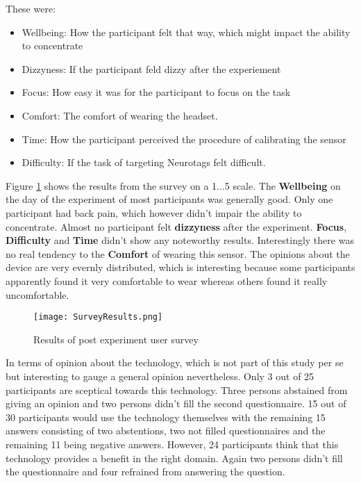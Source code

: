             These were:

            \begin{itemize}
                \item Wellbeing: How the participant felt that way, which might impact the ability to concentrate
                \item Dizzyness: If the participant feld dizzy after the experiement
                \item Focus: How easy it was for the participant to focus on the task
                \item Comfort: The comfort of wearing the headset.
                \item Time: How the participant perceived the procedure of calibrating the sensor 
                \item Difficulty: If the task of targeting Neurotags felt difficult.
            \end{itemize}

            Figure \ref*{survey-boxplots} shows the results from the survey on a 1...5 scale. The \textbf{Wellbeing} on the day of the experiment of most participants was generally good. Only one participant had back pain, which however didn't impair the ability to concentrate. Almost no participant felt \textbf{dizzyness} after the experiment. \textbf{Focus}, \textbf{Difficulty} and \textbf{Time} didn't show any noteworthy results. Interestingly there was no real tendency to the \textbf{Comfort} of wearing this sensor. The opinions about the device are very evernly distributed, which is interesting because some participants apparently found it very comfortable to wear whereas others found it really uncomfortable.

            \begin{figure}[h]     %
                \centering
                \texttt{[image: SurveyResults.png]} 
                \caption{Results of post experiment user survey}\label{survey-boxplots}
            \end{figure} 

            In terms of opinion about the technology, which is not part of this study per se but interesting to gauge a general opinion nevertheless. Only 3 out of 25 participants are sceptical towards this technology. Three persons abstained from giving an opinion and two persons didn't fill the second questionnaire. 15 out of 30 participants would use the technology themselves with the remaining 15 answers consisting of two abstentions, two not filled questionnaires and the remaining 11 being negative answers. However, 24 participants think that this technology provides a benefit in the right domain. Again two persons didn't fill the questionnaire and four refrained from answering the question.

